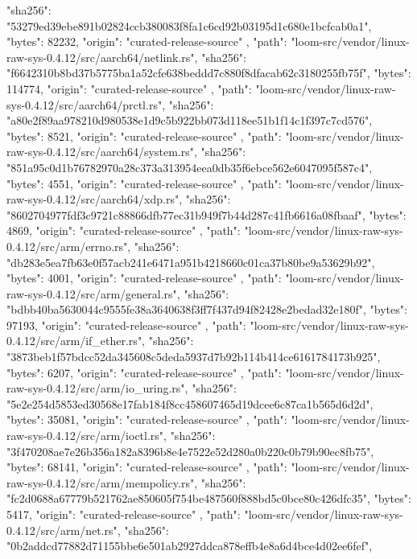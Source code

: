 {{      "sha256": "53279ed39ebe891b02824ccb380083f8fa1c6cd92b03195d1c680e1bcfcab0a1",
      "bytes": 82232,
      "origin": "curated-release-source"
    },
    {
      "path": "loom-src/vendor/linux-raw-sys-0.4.12/src/aarch64/netlink.rs",
      "sha256": "f6642310b8bd37b5775ba1a52cfe638beddd7c880f8dfacab62c3180255fb75f",
      "bytes": 114774,
      "origin": "curated-release-source"
    },
    {
      "path": "loom-src/vendor/linux-raw-sys-0.4.12/src/aarch64/prctl.rs",
      "sha256": "a80e2f89aa978210d980538e1d9c5b922bb073d118ee51b1f14c1f397c7cd576",
      "bytes": 8521,
      "origin": "curated-release-source"
    },
    {
      "path": "loom-src/vendor/linux-raw-sys-0.4.12/src/aarch64/system.rs",
      "sha256": "851a95c0d1b76782970a28c373a313954eea0db35f6ebce562e6047095f587c4",
      "bytes": 4551,
      "origin": "curated-release-source"
    },
    {
      "path": "loom-src/vendor/linux-raw-sys-0.4.12/src/aarch64/xdp.rs",
      "sha256": "8602704977fdf3c9721c88866dfb77ec31b949f7b44d287c41fb6616a08fbaaf",
      "bytes": 4869,
      "origin": "curated-release-source"
    },
    {
      "path": "loom-src/vendor/linux-raw-sys-0.4.12/src/arm/errno.rs",
      "sha256": "db283e5ea7fb63e0f57acb241e6471a951b4218660c01ca37b80be9a53629b92",
      "bytes": 4001,
      "origin": "curated-release-source"
    },
    {
      "path": "loom-src/vendor/linux-raw-sys-0.4.12/src/arm/general.rs",
      "sha256": "bdbb40ba5630044c9555fe38a3640638f3ff7f437d94f82428e2bedad32e180f",
      "bytes": 97193,
      "origin": "curated-release-source"
    },
    {
      "path": "loom-src/vendor/linux-raw-sys-0.4.12/src/arm/if_ether.rs",
      "sha256": "3873beb1f57bdcc52da345608c5deda5937d7b92b114b414ce6161784173b925",
      "bytes": 6207,
      "origin": "curated-release-source"
    },
    {
      "path": "loom-src/vendor/linux-raw-sys-0.4.12/src/arm/io_uring.rs",
      "sha256": "5e2e254d5853ed30568e17fab184f8cc458607465d19dcee6c87ca1b565d6d2d",
      "bytes": 35081,
      "origin": "curated-release-source"
    },
    {
      "path": "loom-src/vendor/linux-raw-sys-0.4.12/src/arm/ioctl.rs",
      "sha256": "3f470208ae7e26b356a182a8396b8e4e7522e52d280a0b220c0b79b90ec8fb75",
      "bytes": 68141,
      "origin": "curated-release-source"
    },
    {
      "path": "loom-src/vendor/linux-raw-sys-0.4.12/src/arm/mempolicy.rs",
      "sha256": "fc2d0688a67779b521762ae850605f754be487560f888bd5c0bce80c426dfc35",
      "bytes": 5417,
      "origin": "curated-release-source"
    },
    {
      "path": "loom-src/vendor/linux-raw-sys-0.4.12/src/arm/net.rs",
      "sha256": "0b2addcd77882d71155bbe6e501ab2927ddca878effb4e8a6d4bce4d02ee6fef",
}}
